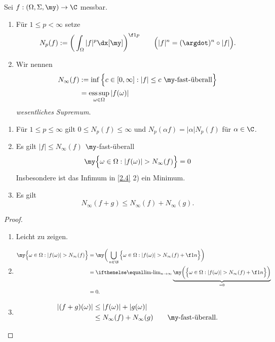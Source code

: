 \begin{df} \label{2.4}
	Sei $f: (\Omega, \Sigma, \my) \to \C$ messbar.
	\begin{enumerate}[1)]
		\item
			Für $1 \le p < \infty$ setze
			\[
				N_p(f) := \bigg( \int_{\Omega} |f|^p \dx[\my] \bigg)^{\f 1p}
				\qquad \Big( |f|^n = (\argdot)^n \circ |f| \Big).
			\]
		\item
			Wir nennen
			\begin{align*}
					\displaystyle N_\infty(f) 
					&:= \inf \Big\{ c \in [0,\infty] : |f|\le c \text{ $\my$-fast-überall} \Big\} \\
					&= \esssup_{\omega \in \Omega} |f(\omega)|
			\end{align*}
			\emph{wesentliches Supremum}.
	\end{enumerate}
\end{df}

\begin{st}[Eigenschaften] \label{2.5}
	\begin{enumerate}[1)]
		\item
			Für $1 \le p \le \infty$ gilt $0 \le N_p(f) \le \infty$ und $N_p(\alpha f) = |\alpha| N_p(f)$ für $\alpha \in \C$.
		\item
			Es gilt $|f| \le N_\infty(f)$ $\my$-fast-überall 
			\[
				\my \Big\{ \omega \in \Omega : |f(\omega)| > N_\infty(f) \Big\} = 0
			\]
			Insbesondere ist das Infimum in \ref{2.4} 2) ein Minimum.
		\item
			Es gilt
			\[
				N_\infty(f+g) \le N_\infty (f) + N_\infty(g).
			\]
	\end{enumerate}
	\begin{proof}
		\begin{enumerate}[1)]
			\item Leicht zu zeigen.
			\item
			\begin{align*}
				\my \Big\{ \omega \in \Omega : |f(\omega)| > N_\infty(f) \Big\}
				&= \my \bigg( \bigcup_{n\in \N} \Big\{ \omega \in \Omega : |f(\omega)| > N_\infty(f) + \f 1n \Big\} \bigg) \\
				&= \lim_{n\to \infty }\underbrace{\my \bigg( \Big\{ \omega \in \Omega : |f(\omega)| > N_\infty(f) + \f 1n \Big\} \bigg)}_{=0} \\
				&=  0.
			\end{align*}
			\item 
			\begin{align*}
				|(f+g)(\omega)|
				& \le |f(\omega)| + |g(\omega)| \\
				& \le N_\infty(f) + N_\infty(g) \qquad \text{$\my$-fast-überall.}
			\end{align*}
		\end{enumerate}
	\end{proof}
\end{st}

